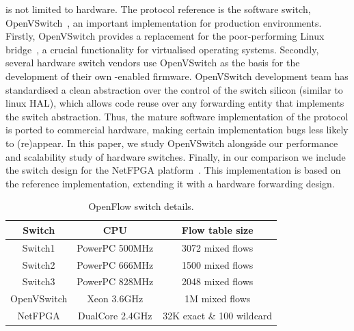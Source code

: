 \of is not limited to hardware. The \of protocol reference is the software
switch, OpenVSwitch~\cite{openvswitch}, an important implementation for
production environments. Firstly, OpenVSwitch provides a replacement for the
poor-performing Linux bridge~\cite{bianco10}, a crucial functionality for
virtualised operating systems.  Secondly, several hardware switch vendors use
OpenVSwitch as the basis for the development of their own \of-enabled firmware.
OpenVSwitch development team has standardised a clean abstraction over the
control of the switch silicon (similar to linux HAL), which allows code reuse
over any forwarding entity that implements the switch abstraction. Thus, the
mature software implementation of the \of protocol is ported to commercial
hardware, making certain implementation bugs less likely to (re)appear.  In this
paper, we study OpenVSwitch alongside our performance and scalability study of
hardware switches. Finally, in our comparison we include the \of switch design
for the NetFPGA platform~\cite{openflow-netfpga}. This implementation is based
on the \of reference implementation, extending it with a hardware forwarding
design. 

\begin{table}[h!]
  \begin{center}
{
  \begin{tabular}{ |c | c | c | }
    \hline                        
    \textbf{Switch} & \textbf{CPU} & \textbf{Flow table size} \\
    \hline  
    Switch1 & PowerPC 500MHz & 3072 mixed flows \\
    \hline  
    Switch2 & PowerPC 666MHz & 1500 mixed flows \\
    \hline  
    Switch3 & PowerPC 828MHz & 2048 mixed flows \\
    \hline  
    OpenVSwitch & Xeon 3.6GHz & 1M mixed flows \\
    \hline  
    NetFPGA &  DualCore 2.4GHz & 32K exact \& 100 wildcard \\
    \hline 
  \end{tabular}  

}
\end{center}
\caption{OpenFlow switch details.}
\label{tbl:switch_list}
\end{table}

